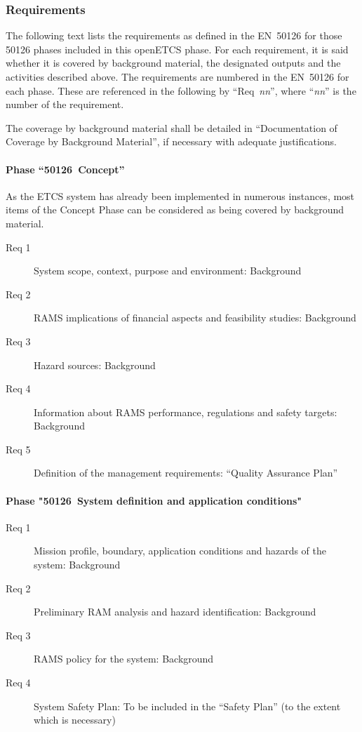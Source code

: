 \documentclass{template/openetcs_article}
\begin{document}
\subsubsection{Requirements}
\label{sec:1-requirements}

The following text lists the requirements as defined in the EN~50126
for those 50126 phases included in this openETCS phase. For each
requirement, it is said whether it is covered by background material,
the designated outputs and the activities described above. The
requirements are numbered in the EN~50126 for each phase. These are
referenced in the following by ``Req~\textit{nn}'', where
``\textit{nn}'' is the number of the requirement.

The coverage by background material shall be detailed in
``Documentation of Coverage by Background Material'', if necessary
with adequate justifications.

\paragraph{Phase ``50126~Concept''}

As the ETCS system has already been implemented in numerous instances,
most items of the Concept Phase can be considered as being covered by
background material. 
%
\begin{description}
  \item[Req 1] System scope, context, purpose and environment: Background
  \item[Req 2] RAMS implications of financial aspects and feasibility studies: Background
  \item[Req 3] Hazard sources: Background
  \item[Req 4] Information about RAMS performance, regulations and
    safety targets: Background
  \item[Req 5] Definition of the management requirements: ``Quality Assurance Plan''
\end{description}


\paragraph{Phase "50126~System definition and application conditions"}


\begin{description}
\item[Req 1] Mission profile, boundary, application conditions and
  hazards of the system: Background
\item[Req 2] Preliminary RAM analysis and hazard identification: Background
\item[Req 3] RAMS policy for the system: Background
\item[Req 4] System Safety Plan: To be included in the ``Safety Plan''
  (to the extent which is necessary)
\end{description}
\end{document}
